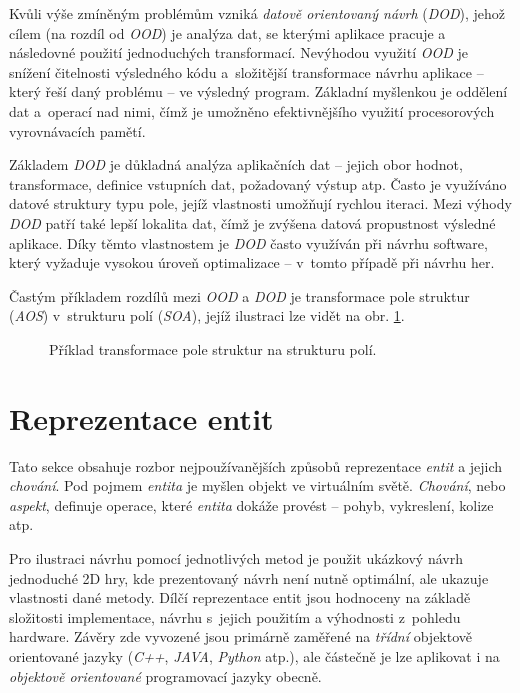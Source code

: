Kvůli výše zmíněným problémům vzniká \emph{datově orientovaný návrh}\cite{DOD} (\emph{DOD}), jehož cílem (na rozdíl od \emph{OOD}) je analýza dat, se kterými aplikace pracuje a následovné použití jednoduchých transformací. Nevýhodou využití \emph{OOD} je snížení čitelnosti výsledného kódu a~složitější transformace návrhu aplikace -- který řeší daný problému -- ve výsledný program. Základní myšlenkou je oddělení dat a~operací nad nimi, čímž je umožněno efektivnějšího využití procesorových vyrovnávacích pamětí.

Základem \emph{DOD} je důkladná analýza aplikačních dat -- jejich obor hodnot, transformace, definice vstupních dat, požadovaný výstup atp. Často je využíváno datové struktury typu pole, jejíž vlastnosti umožňují rychlou iteraci. Mezi výhody \emph{DOD} patří také lepší lokalita dat, čímž je zvýšena datová propustnost výsledné aplikace. Díky těmto vlastnostem je \emph{DOD} často využíván při návrhu software, který vyžaduje vysokou úroveň optimalizace -- v~tomto případě při návrhu her\cite{DataOrientedDesignDice, DataOrientedDesignCppCon}.

Častým příkladem rozdílů mezi \emph{OOD} a \emph{DOD} je transformace pole struktur (\emph{AOS}) v~strukturu polí (\emph{SOA}), jejíž ilustraci lze vidět na obr. \ref{Fig:SOAASO}.

\begin{figure}[]
	\centering
	\caption{Příklad transformace pole struktur na strukturu polí.}
	\label{Fig:SOAASO}
\end{figure}


\section{Reprezentace entit}
\label{Chap:Representation}

Tato sekce obsahuje rozbor nejpoužívanějších způsobů reprezentace \emph{entit} \cite{EvolveHierarchy} a jejich \emph{chování}. Pod pojmem \emph{entita} je myšlen objekt ve virtuálním světě. \emph{Chování}, nebo \emph{aspekt}, definuje operace, které \emph{entita} dokáže provést -- pohyb, vykreslení, kolize atp.

Pro ilustraci návrhu pomocí jednotlivých metod je použit ukázkový návrh jednoduché 2D  hry, kde prezentovaný návrh není nutně optimální, ale ukazuje vlastnosti dané metody. Dílčí reprezentace entit jsou hodnoceny na základě složitosti implementace, návrhu s~jejich použitím a výhodnosti z~pohledu hardware. Závěry zde vyvozené jsou primárně zaměřené na \emph{třídní} objektově orientované jazyky (\emph{C++}, \emph{JAVA}, \emph{Python} atp.), ale částečně je lze aplikovat i na \emph{objektově orientované} programovací jazyky obecně.

